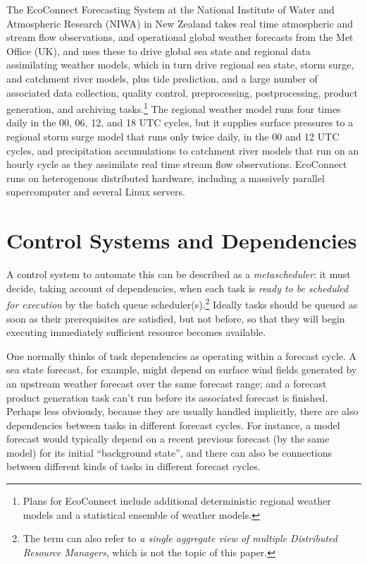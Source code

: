 \documentclass[11pt,a4paper]{article}
\begin{document}
The EcoConnect Forecasting System at the National Institute of Water and
Atmospheric Research (NIWA) in New Zealand takes real time atmospheric
and stream flow observations, and operational global weather forecasts
from the Met Office (UK), and uses these to drive global sea state and
regional data assimilating weather models, which in turn drive regional
sea state, storm surge, and catchment river models, plus tide
prediction, and a large number of associated data collection, quality
control, preprocessing, postprocessing, product generation, and
archiving tasks.\footnote{Plans for EcoConnect include additional
deterministic regional weather models and a statistical ensemble of
weather models.}  The regional weather model runs four times daily in
the 00, 06, 12, and 18 UTC cycles, but it supplies surface pressures to
a regional storm surge model that runs only twice daily, in the 00 and
12 UTC cycles, and precipitation accumulations to catchment river models
that run on an hourly cycle as they assimilate real time stream flow
observations. EcoConnect runs on heterogenous distributed hardware,
including a massively parallel supercomputer and several Linux servers. 



\section{Control Systems and Dependencies}

A control system to automate this can be described as a {\em
metascheduler}: it must decide, taking account of dependencies, when
each task is {\em ready to be scheduled for execution} by the batch
queue scheduler(s).\footnote{The term can also refer to {\it a single
aggregate view of multiple Distributed Resource Managers}, which is not
the topic of this paper.}  Ideally tasks should be queued as soon as
their prerequisites are satisfied, but not before, so that they will
begin executing immediately sufficient resource becomes available. 


One normally thinks of task dependencies as operating within a forecast
cycle. A sea state forecast, for example, might depend on surface wind
fields generated by an upstream weather forecast over the same forecast
range; and a forecast product generation task can't run before its
associated forecast is finished. Perhaps less obviously, because they
are usually handled implicitly, there are also dependencies between
tasks in different forecast cycles. For instance, a model forecast would
typically depend on a recent previous forecast (by the same model) for
its initial ``background state'', and there can also be connections
between different kinds of tasks in different forecast cycles. 
\end{document}
